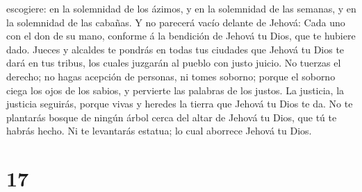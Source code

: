 escogiere: en la solemnidad de los ázimos, y en la solemnidad de las
semanas, y en la solemnidad de las cabañas. Y no parecerá vacío delante
de Jehová:  Cada uno con el don de su mano, conforme á la
bendición de Jehová tu Dios, que te hubiere dado.  Jueces
y alcaldes te pondrás en todas tus ciudades que Jehová tu Dios te dará
en tus tribus, los cuales juzgarán al pueblo con justo juicio.
 No tuerzas el derecho; no hagas acepción de personas, ni
tomes soborno; porque el soborno ciega los ojos de los sabios, y
pervierte las palabras de los justos.  La justicia, la
justicia seguirás, porque vivas y heredes la tierra que Jehová tu Dios
te da.  No te plantarás bosque de ningún árbol cerca del
altar de Jehová tu Dios, que tú te habrás hecho.  Ni te
levantarás estatua; lo cual aborrece Jehová tu Dios.

\hypertarget{section-16}{%
\section{17}\label{section-16}}

